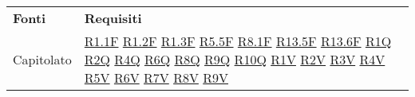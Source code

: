 
\begin{center}
    \centering
    \renewcommand{\arraystretch}{1.8}
    \label{tab:FontiRequisiti}
    \begin{longtable}[!h]{m{50px} m{50px}}
        \rowcolor{logo!70} \textbf{Fonti} & \textbf{Requisiti}                         \\
        Capitolato                        & \hyperref[tab:RequisitiFunzionali]{R1.1F}
        \newline \hyperref[tab:RequisitiFunzionali]{R1.2F}
        \newline \hyperref[tab:RequisitiFunzionali]{R1.3F}
        \newline \hyperref[tab:RequisitiFunzionali]{R5.5F}
        \newline \hyperref[tab:RequisitiFunzionali]{R8.1F}
        \newline \hyperref[tab:RequisitiFunzionali]{R13.5F}
        \newline \hyperref[tab:RequisitiFunzionali]{R13.6F}
        \newline \hyperref[tab:RequisitiQualita]{R1Q}
        \newline \hyperref[tab:RequisitiQualita]{R2Q}
        \newline \hyperref[tab:RequisitiQualita]{R4Q}
        \newline \hyperref[tab:RequisitiQualita]{R6Q}
        \newline \hyperref[tab:RequisitiQualita]{R8Q}
        \newline \hyperref[tab:RequisitiQualita]{R9Q}
        \newline \hyperref[tab:RequisitiQualita]{R10Q}
        \newline \hyperref[tab:RequisitiVincolo]{R1V}
        \newline \hyperref[tab:RequisitiVincolo]{R2V}
        \newline \hyperref[tab:RequisitiVincolo]{R3V}
        \newline \hyperref[tab:RequisitiVincolo]{R4V}
        \newline \hyperref[tab:RequisitiVincolo]{R5V}
        \newline \hyperref[tab:RequisitiVincolo]{R6V}
        \newline \hyperref[tab:RequisitiVincolo]{R7V}
        \newline \hyperref[tab:RequisitiVincolo]{R8V}
        \newline \hyperref[tab:RequisitiVincolo]{R9V}

\end{longtable}
\end{center}

